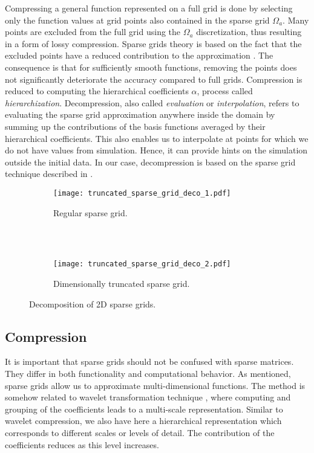 Compressing a general function represented on a full grid is done by selecting
only the function values at grid points also contained in the sparse grid $\Omega_a$. 
Many points are excluded from the full grid using the $\Omega_a$ discretization,
thus resulting in a form of lossy compression. 
Sparse grids theory is based on the fact that the excluded points have a reduced
contribution to the approximation \cite{CambridgeJournals:227245}. The
consequence is that for sufficiently smooth functions, removing the points does
not significantly deteriorate the accuracy compared to full grids.
Compression is reduced to computing the hierarchical coefficients $\alpha$,
process called \textit{hierarchization}. Decompression, also called
\textit{evaluation} or \textit{interpolation}, refers to evaluating the sparse
grid approximation anywhere inside the domain by summing up the contributions of
the basis functions averaged by their hierarchical coefficients. This also
enables us to interpolate at points for which we do not have values from
simulation. Hence, it can provide hints on the simulation outside the initial
data. In our case, decompression is based on the sparse grid technique described
in \cite{CambridgeJournals:227245}.

\begin{figure}[t]
  \begin{subfigure}[b]{1\linewidth}
    \centering
    \texttt{[image: truncated\_sparse\_grid\_deco\_1.pdf]}
    \caption{Regular sparse grid.}
    \label{fig:truncated_sparse_grid_deco_1}
  \end{subfigure}
  \\ \\
  \begin{subfigure}[b]{1\linewidth}
    \centering
    \texttt{[image: truncated\_sparse\_grid\_deco\_2.pdf]}
    \caption{Dimensionally truncated sparse grid.}
    \label{fig:truncated_sparse_grid_deco_2}
  \end{subfigure}
  \caption{Decomposition of 2D sparse grids.}
  \label{fig:truncated_sparse_grid_deco}
\end{figure}

\subsection{Compression}

It is important that sparse grids should not be confused with sparse matrices.
They differ in both functionality and computational behavior. As mentioned,
sparse grids allow us to approximate multi-dimensional functions. The method is
somehow related to wavelet transformation technique \cite{Mallat89atheory},
where computing and grouping of the coefficients leads to a multi-scale
representation. Similar to wavelet compression, we also have here a hierarchical
representation which corresponds to different scales or levels of detail. The
contribution of the coefficients reduces as this level increases.

